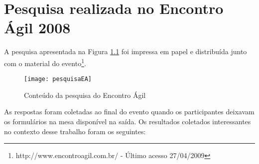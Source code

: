 \chapter{Pesquisa realizada no Encontro Ágil 2008}
\label{ape:EA}

A pesquisa apresentada na Figura \ref{fig:pesquisaEA} foi impressa em
papel e distribuída junto com o material do
evento\footnote{http://www.encontroagil.com.br/ - Último acesso
  27/04/2009}.

\begin{figure}[th]
  \centering
  \texttt{[image: pesquisaEA]}
  \caption{Conteúdo da pesquisa do Encontro Ágil}
  \label{fig:pesquisaEA}
\end{figure}

As respostas foram coletadas ao final do evento quando os
participantes deixavam os formulários na mesa disponível na saída. Os
resultados coletados interessantes no contexto desse trabalho foram os
seguintes:

